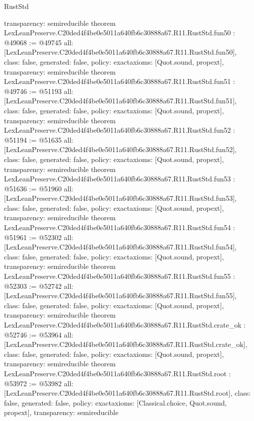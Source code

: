 \begin{lexlean}{RustStd}
\begin{coremodule}
{  transparency: semireducible
}
theorem LexLeanPreserve.C20ded4f4be0e5011a640fb6c30888a67.R11.RustStd.fun50 : @49068 := @49745 {
  all: [LexLeanPreserve.C20ded4f4be0e5011a640fb6c30888a67.R11.RustStd.fun50],
  class: false,
  generated: false,
  policy: exact{axioms: [Quot.sound, propext]},
  transparency: semireducible
}
theorem LexLeanPreserve.C20ded4f4be0e5011a640fb6c30888a67.R11.RustStd.fun51 : @49746 := @51193 {
  all: [LexLeanPreserve.C20ded4f4be0e5011a640fb6c30888a67.R11.RustStd.fun51],
  class: false,
  generated: false,
  policy: exact{axioms: [Quot.sound, propext]},
  transparency: semireducible
}
theorem LexLeanPreserve.C20ded4f4be0e5011a640fb6c30888a67.R11.RustStd.fun52 : @51194 := @51635 {
  all: [LexLeanPreserve.C20ded4f4be0e5011a640fb6c30888a67.R11.RustStd.fun52],
  class: false,
  generated: false,
  policy: exact{axioms: [Quot.sound, propext]},
  transparency: semireducible
}
theorem LexLeanPreserve.C20ded4f4be0e5011a640fb6c30888a67.R11.RustStd.fun53 : @51636 := @51960 {
  all: [LexLeanPreserve.C20ded4f4be0e5011a640fb6c30888a67.R11.RustStd.fun53],
  class: false,
  generated: false,
  policy: exact{axioms: [Quot.sound, propext]},
  transparency: semireducible
}
theorem LexLeanPreserve.C20ded4f4be0e5011a640fb6c30888a67.R11.RustStd.fun54 : @51961 := @52302 {
  all: [LexLeanPreserve.C20ded4f4be0e5011a640fb6c30888a67.R11.RustStd.fun54],
  class: false,
  generated: false,
  policy: exact{axioms: [Quot.sound, propext]},
  transparency: semireducible
}
theorem LexLeanPreserve.C20ded4f4be0e5011a640fb6c30888a67.R11.RustStd.fun55 : @52303 := @52742 {
  all: [LexLeanPreserve.C20ded4f4be0e5011a640fb6c30888a67.R11.RustStd.fun55],
  class: false,
  generated: false,
  policy: exact{axioms: [Quot.sound, propext]},
  transparency: semireducible
}
theorem LexLeanPreserve.C20ded4f4be0e5011a640fb6c30888a67.R11.RustStd.crate_ok : @52746 := @53964 {
  all: [LexLeanPreserve.C20ded4f4be0e5011a640fb6c30888a67.R11.RustStd.crate_ok],
  class: false,
  generated: false,
  policy: exact{axioms: [Quot.sound, propext]},
  transparency: semireducible
}
theorem LexLeanPreserve.C20ded4f4be0e5011a640fb6c30888a67.R11.RustStd.root : @53972 := @53982 {
  all: [LexLeanPreserve.C20ded4f4be0e5011a640fb6c30888a67.R11.RustStd.root],
  class: false,
  generated: false,
  policy: exact{axioms: [Classical.choice, Quot.sound, propext]},
  transparency: semireducible
}


\end{coremodule}
\end{lexlean}
